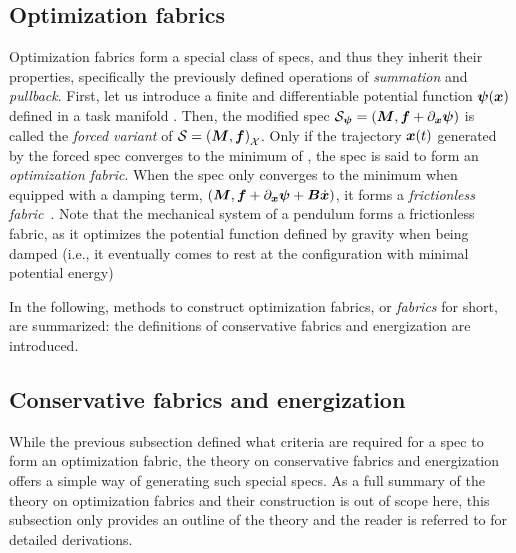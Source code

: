 \subsection{Optimization fabrics}%
\label{sub:optimization_fabrics}

Optimization fabrics form a special class of specs, and thus they inherit their properties,
specifically the previously defined operations of \textit{summation} and \textit{pullback}.
First, let us introduce a finite and differentiable potential
function $\bm{\psi}(\bm{x})$ defined in a task manifold \X{}. 
Then, the modified spec $\mathcal{S}_{\bm{\psi}} = \left(\bm{M},\bm{f} + \partial_{\bm{x}}\bm{\psi}\right)$
is called the \textit{forced variant} of $\mathcal{S} = \left(\bm{M},\bm{f}\right)_{\mathcal{X}}$.
Only if the trajectory $\bm{x}(t)$ generated by the forced spec converges to the minimum of \forc{}, 
the spec is said to form an \textit{optimization fabric}.
When the spec only converges to the minimum when equipped with a damping term,
$\left(\bm{M},\bm{f} + \partial_{\bm{x}}\bm{\psi} + \bm{B}\dot{\bm{x}}\right)$, 
it forms a \textit{frictionless fabric}~\cite[Definition 4.4]{Ratliff2020}. 
Note that the mechanical system of a pendulum forms a frictionless fabric, as it optimizes
the potential function defined by gravity when being damped (i.e., it eventually comes to
rest at the configuration with minimal potential energy)

In the following, methods to construct optimization fabrics, or \textit{fabrics} for
short, are summarized: the definitions of conservative fabrics and energization are
introduced.

\subsection{Conservative fabrics and energization}%
\label{sub:conservative_fabrics_and_energization}

While the previous subsection defined what criteria are required for a spec to form
an optimization fabric, the theory on conservative fabrics and energization 
offers a simple way of generating such special specs. As a full summary of the theory
on optimization fabrics and their construction is out of scope here, this
subsection only provides an outline of the theory and the reader is referred to 
\cite{Ratliff2021,Wyk2022} for detailed derivations.

